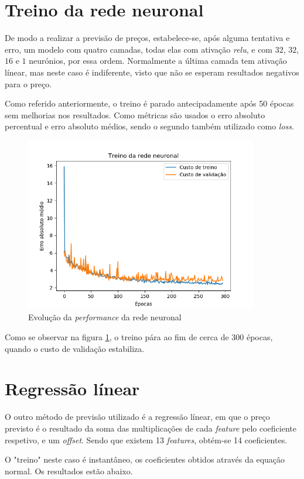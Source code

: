 \documentclass[a4paper,2pt]{report}
\begin{document}
    \section{Treino da rede neuronal}
        \par De modo a realizar a previsão de preços, estabelece-se, após alguma tentativa e erro, um modelo com quatro camadas, todas elas com ativação \textit{relu}, e com \(32\), \(32\), \(16\) e \(1\) neurónios, por essa ordem. Normalmente a última camada tem ativação línear, mas neste caso é indiferente, visto que não se esperam resultados negativos para o preço.
        \par Como referido anteriormente, o treino é parado antecipadamente após 50 épocas sem melhorias nos resultados. Como métricas são usados o erro absoluto percentual e erro absoluto médios, sendo o segundo também utilizado como \textit{loss}. 
        \begin{figure}[H]
            \centering
            \includegraphics[width = 4in]{training.png}
            \caption{Evolução da \textit{performance} da rede neuronal}
            \label{fig_treino_rede}
        \end{figure}
        \par Como se observar na figura \ref{fig_treino_rede}, o treino pára ao fim de cerca de \(300\) épocas, quando o custo de validação estabiliza.

    \section{Regressão línear}
        \par O outro método de previsão utilizado é a regressão línear, em que o preço previsto é o resultado da soma das multiplicações de cada \textit{feature} pelo coeficiente respetivo, e um \textit{offset}. Sendo que existem 13 \textit{features}, obtém-se 14 coeficientes.
        \par O "treino" neste caso é instantâneo, os coeficientes obtidos através da equação normal. Os resultados estão abaixo.
    
\end{document}

